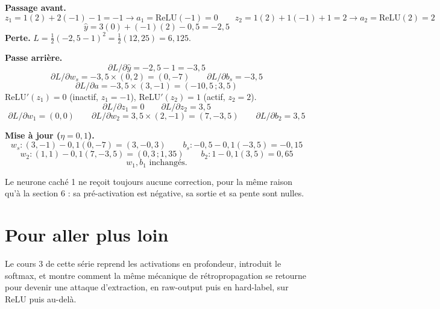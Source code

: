 \documentclass[11pt]{article}
\begin{document}
\begin{sol}
\textbf{Passage avant.}
\[ z_1 = 1(2)+2(-1)-1=-1 \to a_1=\mathrm{ReLU}(-1)=0 \qquad z_2=1(2)+1(-1)+1=2 \to a_2=\mathrm{ReLU}(2)=2 \]
\[ \hat y = 3(0)+(-1)(2)-0{,}5 = -2{,}5 \]
\textbf{Perte.} $L=\tfrac12(-2{,}5-1)^2=\tfrac12(12{,}25)=6{,}125$.

\textbf{Passe arrière.}
\[ \partial L/\partial\hat y = -2{,}5-1=-3{,}5 \]
\[ \partial L/\partial w_s = -3{,}5\times(0,2)=(0,-7) \qquad \partial L/\partial b_s=-3{,}5 \]
\[ \partial L/\partial a = -3{,}5\times(3,-1)=(-10{,}5\,;3{,}5) \]
ReLU$'(z_1)=0$ (inactif, $z_1=-1$), ReLU$'(z_2)=1$ (actif, $z_2=2$).
\[ \partial L/\partial z_1 = 0 \qquad \partial L/\partial z_2 = 3{,}5 \]
\[ \partial L/\partial w_1 = (0,0) \qquad \partial L/\partial w_2 = 3{,}5\times(2,-1)=(7,-3{,}5) \qquad \partial L/\partial b_2 = 3{,}5 \]

\textbf{Mise à jour ($\eta=0{,}1$).}
\[ w_s: (3,-1)-0{,}1(0,-7)=(3,-0{,}3) \qquad b_s: -0{,}5-0{,}1(-3{,}5)=-0{,}15 \]
\[ w_2: (1,1)-0{,}1(7,-3{,}5)=(0{,}3\,;1{,}35) \qquad b_2: 1-0{,}1(3{,}5)=0{,}65 \]
\[ w_1, b_1 \text{ inchangés.} \]

Le neurone caché 1 ne reçoit toujours aucune correction, pour la même raison qu'à la section 6 : sa pré-activation est négative, sa sortie et sa pente sont nulles.
\end{sol}

\section{Pour aller plus loin}

Le cours 3 de cette série reprend les activations en profondeur, introduit le softmax, et montre comment la même mécanique de rétropropagation se retourne pour devenir une attaque d'extraction, en raw-output puis en hard-label, sur ReLU puis au-delà.
\end{document}
